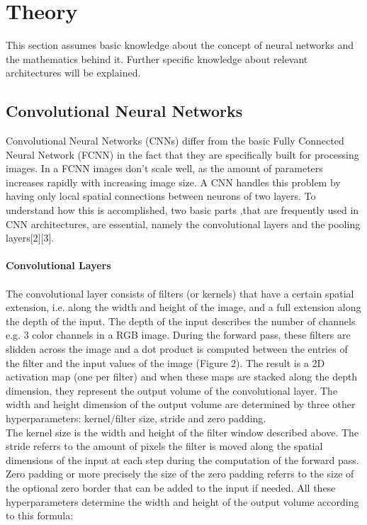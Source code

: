 \documentclass{article}
\begin{document}
\newpage
\section{Theory}
This section assumes basic knowledge about the concept of neural networks and the mathematics behind it. Further specific knowledge about relevant architectures will be explained.

\subsection{Convolutional Neural Networks}
Convolutional Neural Networks (CNNs) differ from the basic Fully Connected Neural Network (FCNN) in the fact that they are specifically built for processing images. In a FCNN images don't scale well, as the amount of parameters increases rapidly with increasing image size. A CNN handles this problem by having only local spatial connections between neurons of two layers. To understand how this is accomplished, two basic parts  ,that are frequently used in CNN architectures, are essential, namely the convolutional layers and the pooling layers[2][3].\\\\
\textbf{Convolutional Layers}\\\\
The convolutional layer consists of filters (or kernels) that have a certain spatial extension, i.e. along the width and height of the image, and a full extension along the depth of the input. The depth of the input describes the number of channels e.g. 3 color channels in a RGB image. During the forward pass, these filters are slidden across the image and a dot product is computed between the entries of the filter and the input values of the image (Figure 2). The result is a 2D activation map (one per filter) and when these maps are stacked along the depth dimension, they represent the output volume of the convolutional layer.
The width and height dimension of the output volume are determined by three other hyperparameters: kernel/filter size, stride and zero padding.\\
The kernel size is the width and height of the filter window described above. The stride referrs to the amount of pixels the filter is moved along the spatial dimensions of the input at each step during the computation of the forward pass. Zero padding or more precisely the size of the zero padding referrs to the size of the optional zero border that can be added to the input if needed. All these hyperparameters determine the width and height of the output volume according to this formula:
\end{document}
